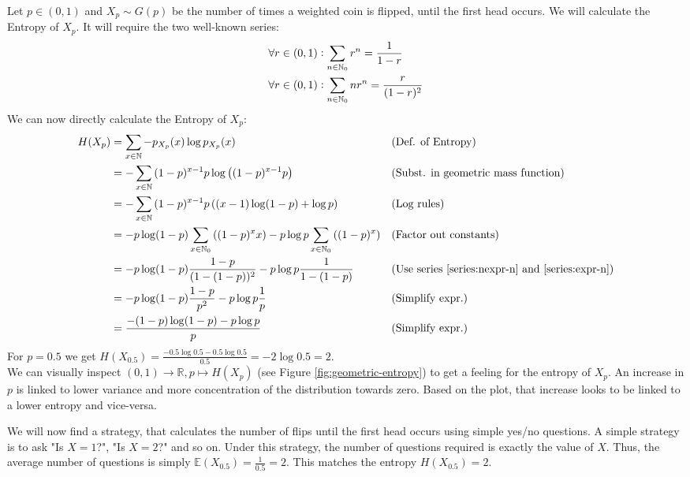 \begin{example}
    Let $p \in (0, 1)$ and $X_p \sim G(p)$ be the number of times a weighted coin is flipped, until the first head occurs.
    We will calculate the Entropy of $X_p$. It will require the two well-known series:
    \begin{align}
        \forall r \in (0, 1)&\vcentcolon \sum_{n \in \mathbb{N}_0}{r^n} = \frac{1}{1 - r} \label{series:nexpr-n}\\
        \forall r \in (0, 1)&\vcentcolon \sum_{n \in \mathbb{N}_0}{n r^n} = \frac{r}{(1 - r)^2} \label{series:expr-n}
    \end{align}
    We can now directly calculate the Entropy of $X_p$:
    \begin{align*}
        H(X_p) &= \sum_{x \in \mathbb{N}}{-p_{X_p}(x) \log p_{X_p}(x)}                       && \text{(Def. of Entropy)}\\
        &= -\sum_{x \in \mathbb{N}}{(1-p)^{x-1} p \log\left((1-p)^{x-1} p\right)}                && \text{(Subst. in geometric mass function)} \\
        &= -\sum_{x \in \mathbb{N}}{(1-p)^{x-1} p \left((x-1) \log(1-p) + \log p\right)}         && \text{(Log rules)} \\
        &= -p \log(1-p) \sum_{x \in \mathbb{N}_{0}}\left((1-p)^{x} x\right) - p \log p \sum_{x \in \mathbb{N}_{0}}\left((1-p)^{x}\right)      && \text{(Factor out constants)} \\
        &= -p \log(1-p) \frac{1-p}{(1 - (1-p))^2} - p \log p \frac{1}{1 - (1-p)}            && \text{(Use series \ref{series:nexpr-n} and \ref{series:expr-n})}\\
        &= -p \log(1-p) \frac{1-p}{p^2} - p \log p \frac{1}{p}                              && \text{(Simplify expr.)} \\
        &= \frac{-(1-p) \log(1-p) - p \log p}{p}                                            && \text{(Simplify expr.)}
    \end{align*}
    For $p=0.5$ we get $H(X_{0.5}) = \frac{-0.5 \log 0.5 - 0.5 \log 0.5}{0.5} = -2 \log 0.5 = 2$. \\
    We can visually inspect $(0, 1) \rightarrow \mathbb{R}, p \mapsto H(X_p)$ (see Figure \ref{fig:geometric-entropy}) to get a feeling for the entropy of $X_p$.
    An increase in $p$ is linked to lower variance and more concentration of the distribution towards zero. 
    Based on the plot, that increase looks to be linked to a lower entropy and vice-versa.

    We will now find a strategy, that calculates the number of flips until the first head occurs using simple yes/no questions.
    A simple strategy is to ask "Is $X=1$?", "Is $X=2$?" and so on.
    Under this strategy, the number of questions required is exactly the value of $X$.
    Thus, the average number of questions is simply $\mathbb{E}(X_{0.5}) = \frac{1}{0.5} = 2$. 
    This matches the entropy $H(X_{0.5}) = 2$.
\end{example}

